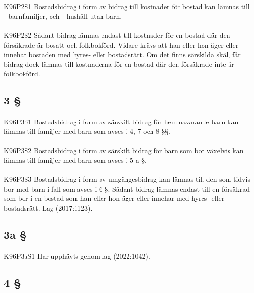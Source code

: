 \documentclass[a4paper,notitlepage,openany,10pt]{book}
\begin{document}
\paragraph*{}
{\tiny K96P2S1}
Bostadsbidrag i form av bidrag till kostnader för bostad kan lämnas till
\newline - barnfamiljer, och
\newline - hushåll utan barn.
\paragraph*{}
{\tiny K96P2S2}
Sådant bidrag lämnas endast till kostnader för en bostad där den försäkrade är bosatt och folkbokförd. Vidare krävs att han eller hon äger eller innehar bostaden med hyres- eller bostadsrätt. Om det finns särskilda skäl, får bidrag dock lämnas till kostnaderna för en bostad där den försäkrade inte är folkbokförd.
\subsection*{3 §}
\paragraph*{}
{\tiny K96P3S1}
Bostadsbidrag i form av särskilt bidrag för hemmavarande barn kan lämnas till familjer med barn som avses i 4, 7 och 8 §§.
\paragraph*{}
{\tiny K96P3S2}
Bostadsbidrag i form av särskilt bidrag för barn som bor växelvis kan lämnas till familjer med barn som avses i 5 a §.
\paragraph*{}
{\tiny K96P3S3}
Bostadsbidrag i form av umgängesbidrag kan lämnas till den som tidvis bor med barn i fall som avses i 6 §. Sådant bidrag lämnas endast till en försäkrad som bor i en bostad som han eller hon äger eller innehar med hyres- eller bostadsrätt.
Lag (2017:1123).
\subsection*{3a §}
\paragraph*{}
{\tiny K96P3aS1}
Har upphävts genom
lag (2022:1042).
\subsection*{4 §}
\end{document}
